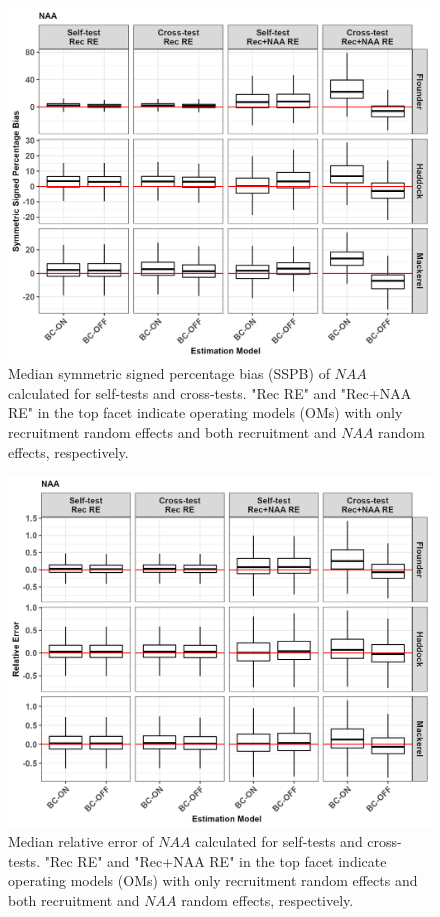\documentclass[
  12pt,
]{article}
\begin{document}
\begin{figure}[H]
    \centering
    \includegraphics[width=\textwidth]{Original_Figures&Tables/Median_NAA_SSPB.PNG}
    \caption{Median symmetric signed percentage bias (SSPB) of $NAA$ calculated for self-tests and cross-tests. "Rec RE" and "Rec+NAA RE" in the top facet indicate operating models (OMs) with only recruitment random effects and both recruitment and $NAA$ random effects, respectively.}
    \label{fig:supp_NAA_SSPB}
\end{figure}

\begin{figure}[H]
    \centering
    \includegraphics[width=\textwidth]{Original_Figures&Tables/Median_NAA.PNG}
    \caption{Median relative error of $NAA$ calculated for self-tests and cross-tests. "Rec RE" and "Rec+NAA RE" in the top facet indicate operating models (OMs) with only recruitment random effects and both recruitment and $NAA$ random effects, respectively.}
    \label{fig:supp_Median_NAA}
\end{figure}
\end{document}
